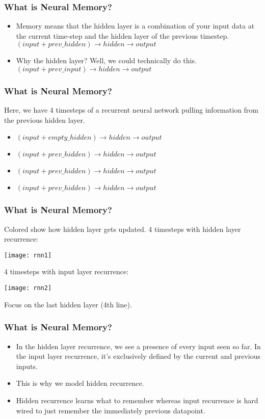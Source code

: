 \begin{frame}[fragile] \frametitle{What is Neural Memory?}
\begin{itemize}
\item Memory means that the hidden layer is a combination of your input data at the current time-step and the hidden layer of the previous timestep.
$ (input + prev\_hidden) \rightarrow hidden \rightarrow output$
\item Why the hidden layer? Well, we could technically do this. 
$(input + prev\_input) \rightarrow hidden \rightarrow output$
\end{itemize}
\end{frame}

\begin{frame}[fragile] \frametitle{What is Neural Memory?}
Here, we have 4 timesteps of a recurrent neural network pulling information from the previous hidden layer.
\begin{itemize}
\item $(input + empty\_hidden) \rightarrow hidden \rightarrow output$
\item $(input + prev\_hidden) \rightarrow hidden \rightarrow output$
\item $(input + prev\_hidden) \rightarrow hidden \rightarrow output$
\item $(input + prev\_hidden) \rightarrow hidden \rightarrow output$
\end{itemize}
\end{frame}

\begin{frame}[fragile] \frametitle{What is Neural Memory?}
Colored show how hidden layer gets updated. 
4 timesteps with hidden layer recurrence:
\begin{center}
\texttt{[image: rnn1]}
\end{center}
4 timesteps with input  layer recurrence:
\begin{center}
\texttt{[image: rnn2]}
\end{center}
Focus on the last hidden layer (4th line).
\end{frame}

\begin{frame}[fragile] \frametitle{What is Neural Memory?}
\begin{itemize}
\item  In the hidden layer recurrence, we see a presence of every input seen so far. In the input layer recurrence, it's exclusively defined by the current and previous inputs. 
\item This is why we model hidden recurrence.
\item Hidden recurrence learns what to remember whereas input recurrence is hard wired to just remember the immediately previous datapoint. 
\end{itemize}
\end{frame}

